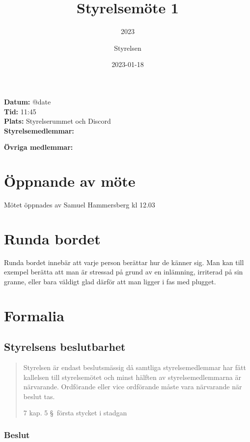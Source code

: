 \documentclass[protokoll]{dvd}
\begin{document}
\title{Styrelsemöte 1}
\subtitle{2023}
\author{Styrelsen}
\date{2023-01-18}

\textbf{Datum:} \csname @date\endcsname\\
\textbf{Tid:} 11:45\\
\textbf{Plats:} Styrelserummet och Discord\\
\textbf{Styrelsemedlemmar:}
\begin{närvarande_förtroendevalda}
\end{närvarande_förtroendevalda}

\textbf{Övriga medlemmar:} \\


\section{Öppnande av möte}

Mötet öppnades av Samuel Hammersberg kl 12.03

\section{Runda bordet}

Runda bordet innebär att varje person berättar hur de känner sig.
Man kan till exempel berätta att man är stressad på grund av en inlämning, irriterad på sin granne, eller bara väldigt glad därför att man ligger i fas med plugget.

\section{Formalia}

\subsection{Styrelsens beslutbarhet}

\blockquote[7 kap. 5 \S~första stycket i stadgan][]{%
    Styrelsen är endast beslutsmässig då samtliga styrelsemedlemmar har fått kallelsen till styrelsemötet och minst hälften av styrelsemedlemmarna är närvarande.
    Ordförande eller vice ordförande måste vara närvarande när beslut tas.
}

\subsubsection*{Beslut}
\end{document}
